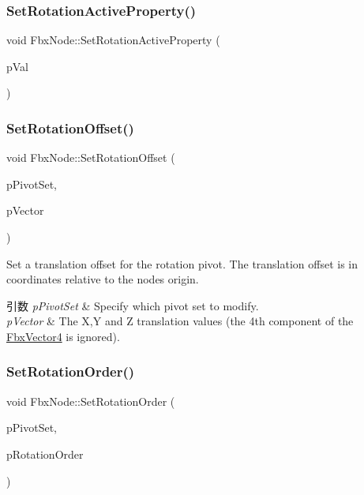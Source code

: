 \subsubsection{\texorpdfstring{Set\+Rotation\+Active\+Property()}{SetRotationActiveProperty()}}
{\footnotesize\ttfamily void Fbx\+Node\+::\+Set\+Rotation\+Active\+Property (\begin{DoxyParamCaption}\item[{bool}]{p\+Val }\end{DoxyParamCaption})}

\mbox{\label{class_fbx_node_adfb076b476353dde01ba411c487477bf}} 
\subsubsection{\texorpdfstring{Set\+Rotation\+Offset()}{SetRotationOffset()}}
{\footnotesize\ttfamily void Fbx\+Node\+::\+Set\+Rotation\+Offset (\begin{DoxyParamCaption}\item[{\hyperlink{class_fbx_node_ae62b7311ac4727654cdf1ebd5cbf7343}{E\+Pivot\+Set}}]{p\+Pivot\+Set,  }\item[{\hyperlink{class_fbx_vector4}{Fbx\+Vector4}}]{p\+Vector }\end{DoxyParamCaption})}

Set a translation offset for the rotation pivot. The translation offset is in coordinates relative to the node\textquotesingle{}s origin. 
\begin{DoxyParams}{引数}
{\em p\+Pivot\+Set} & Specify which pivot set to modify. \\
\hline
{\em p\+Vector} & The X,Y and Z translation values (the 4th component of the \hyperlink{class_fbx_vector4}{Fbx\+Vector4} is ignored). \\
\hline
\end{DoxyParams}
\mbox{\label{class_fbx_node_a360b2d1aba9f7a7cf0b09f1d4e921885}} 
\subsubsection{\texorpdfstring{Set\+Rotation\+Order()}{SetRotationOrder()}}
{\footnotesize\ttfamily void Fbx\+Node\+::\+Set\+Rotation\+Order (\begin{DoxyParamCaption}\item[{\hyperlink{class_fbx_node_ae62b7311ac4727654cdf1ebd5cbf7343}{E\+Pivot\+Set}}]{p\+Pivot\+Set,  }\item[{\hyperlink{fbxmath_8h_ae46778666b56bb0abe5992b855fe9332}{E\+Fbx\+Rotation\+Order}}]{p\+Rotation\+Order }\end{DoxyParamCaption})}


